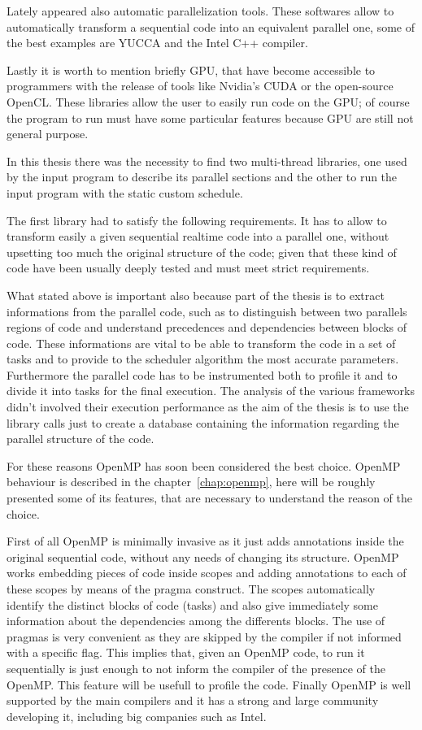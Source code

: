 \documentclass[a4paper,11pt,oneside]{book}
\begin{document}
Lately appeared also automatic parallelization tools. These softwares allow to automatically transform a sequential code into an equivalent parallel one, some of the best examples are YUCCA and the Intel C++ compiler. 

Lastly it is worth to mention briefly GPU, that have become accessible to programmers with the release of tools like Nvidia's CUDA or the open-source OpenCL. These libraries allow the user to easily run code on the GPU; of course the program to run must have some particular features because GPU are still not general purpose. 

In this thesis there was the necessity to find two multi-thread libraries, one used by the input program to describe its parallel sections and the other to run the input program with the static custom schedule. 

The first library had to satisfy the following requirements. It has to allow to transform easily a given sequential real\-time code into a parallel one, without upsetting too much the original structure of the code; given that these kind of code have been usually deeply tested and must meet strict requirements.

What stated above is important also because part of the thesis is to extract informations from the parallel code, such as to distinguish between two parallels regions of code and understand precedences and dependencies between blocks of code. These informations are vital to be able to transform the code in a set of tasks and to provide to the scheduler algorithm the most accurate parameters. Furthermore the parallel code has to be instrumented both to profile it and to divide it into tasks for the final execution. The analysis of the various frameworks didn’t involved their execution performance as the aim of the thesis is to use the library calls just to create a database containing the information regarding the parallel structure of the code.  

For these reasons OpenMP has soon been considered the best choice. OpenMP behaviour is described in the chapter~\ref{chap:openmp}, here will be roughly presented some of its features, that are necessary to understand the reason of the choice.  

First of all OpenMP is minimally invasive as it just adds annotations inside the original sequential code, without any needs of changing its structure. OpenMP works embedding pieces of code inside scopes and adding annotations to each of these scopes by means of the pragma construct. The scopes automatically identify the distinct blocks of code (tasks) and also give immediately some information about the dependencies among the differents blocks. The use of pragmas is very convenient as they are skipped by the compiler if not informed with a specific flag. This implies that, given an OpenMP code, to run it sequentially is just enough to not inform the compiler of the presence of the OpenMP. This feature will be usefull to profile the code. Finally OpenMP is well supported by the main compilers and it has a strong and large community developing it, including big companies such as Intel.  
\end{document}
